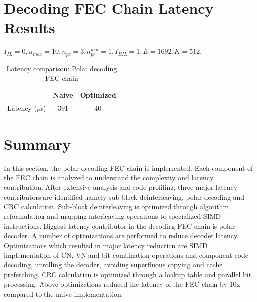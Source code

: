 \section{Decoding FEC Chain Latency Results}

$I_{IL} = 0, n_{max} = 10, n_{pc} = 3 ,n_{pc}^{wm} = 1, I_{BIL} = 1, E = 1692, K = 512$.
\begin{table}[!h]
	\begin{center}
		\caption{Latency comparison: Polar decoding FEC chain}
		\label{tab:decodingFECChainLatency}
		\begin{tabular}{c|c|c} %
			\textbf{ } & Naive & Optimized \\
			\hline
			Latency ($\mu$s) & $391$ & $40$\\
		\end{tabular}
	\end{center}
\end{table}

\section{Summary}
In this section, the polar decoding FEC chain is implemented. Each component of the FEC chain is analyzed to understand the complexity and latency contribution. After extensive analysis and code profiling, three major latency contributors are identified namely sub-block deinterleaving, polar decoding and CRC calculation. Sub-block deinterleaving is optimized through algorithm reformulation and mapping interleaving operations to specialized SIMD instructions. Biggest latency contributor in the decoding FEC chain is polar decoder. A number of optimizations are performed to reduce decoder latency. Optimizations which resulted in major latency reduction are SIMD implementation of CN, VN and bit combination operations and component code decoding, unrolling the decoder, avoiding superfluous copying and cache prefetching. CRC calculation is optimized through a lookup table and parallel bit processing. Above optimizations reduced the latency of the FEC chain by 10x compared to the naive implementation.
